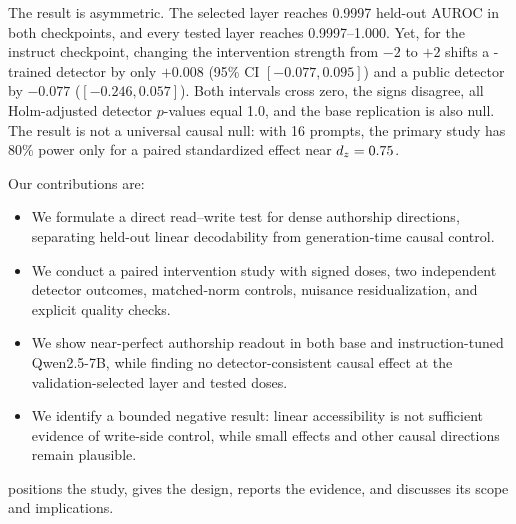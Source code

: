 The result is asymmetric. The selected layer reaches 0.9997 held-out AUROC in both checkpoints, and every tested layer reaches 0.9997--1.000. Yet, for the instruct checkpoint, changing the intervention strength from $-2$ to $+2$ shifts a \mage-trained detector by only $+0.008$ (95\% CI $[-0.077,0.095]$) and a public \publicdet detector by $-0.077$ ($[-0.246,0.057]$). Both intervals cross zero, the signs disagree, all Holm-adjusted detector $p$-values equal 1.0, and the base replication is also null. The result is not a universal causal null: with 16 prompts, the primary study has 80\% power only for a paired standardized effect near $d_z=0.75$.

Our contributions are:
\begin{itemize}[leftmargin=*,itemsep=0pt,topsep=0pt]
    \item We formulate a direct read--write test for dense authorship directions, separating held-out linear decodability from generation-time causal control.
    \item We conduct a paired intervention study with signed doses, two independent detector outcomes, matched-norm controls, nuisance residualization, and explicit quality checks.
    \item We show near-perfect authorship readout in both base and instruction-tuned Qwen2.5-7B, while finding no detector-consistent causal effect at the validation-selected layer and tested doses.
    \item We identify a bounded negative result: linear accessibility is not sufficient evidence of write-side control, while small effects and other causal directions remain plausible.
\end{itemize}

 positions the study,  gives the design,  reports the evidence, and  discusses its scope and implications.

